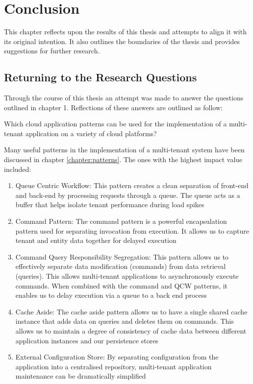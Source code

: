 \chapter{Conclusion}

This chapter reflects upon the results of this thesis and attempts to align it with its original intention. It also outlines the boundaries of the thesis and provides suggestions for further research. 


\section{Returning to the Research Questions}
Through the course of this thesis an attempt was made to answer the questions outlined in chapter 1. Reflections of these answers are outlined as follow:

\begin{tcolorbox}[title=Research Question 1]
Which cloud application patterns can be used for the implementation of a multi-tenant application on a variety of cloud platforms?
\end{tcolorbox}



Many useful patterns in the implementation of a multi-tenant system have been discussed in chapter \ref{chapter:patterns}. The ones with the highest impact value included:
\vfill
\begin{enumerate}
\item Queue Centric Workflow: This pattern creates a clean separation of front-end and back-end by processing requests through a queue. The queue acts as a buffer that helps isolate tenant performance during load spikes
\item Command Pattern: The command pattern is a powerful encapsulation pattern used for separating invocation from execution. It allows us to capture tenant and entity data together for delayed execution
\item Command Query Responsibility Segregation: This pattern allows us to effectively separate data modification (commands) from data retrieval (queries). This allows multi-tenant applications to asynchronously execute commands. When combined with the command and QCW patterns, it enables us to delay execution via a queue to a back end process
\item Cache Aside: The cache aside pattern allows us to have a single shared cache instance that adds data on queries and deletes them on commands. This allows us to maintain a degree of consistency of cache data between different application instances and our persistence stores
\item External Configuration Store: By separating configuration from the application into a centralised repository, multi-tenant application maintenance can be dramatically simplified
\end{enumerate}

